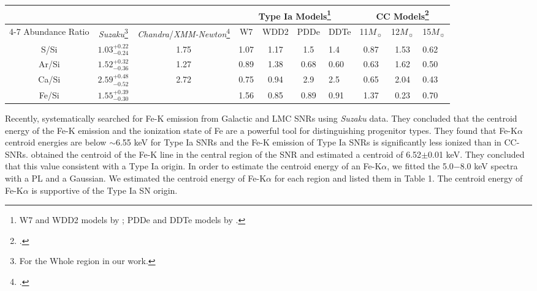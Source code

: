 \documentclass[useAMS,usenatbib]{mn2e}
\begin{document}
\begin{table*}
\caption{Comparisons of Abundance Ratios between
G306.3$-$0.9 and models.}
\begin{center}
 \begin{minipage}{140mm}
\renewcommand{\arraystretch}{1.5}
 \begin{tabular}{@{}ccccccp{1.2cm}ccp{1.2cm}@{}}
  \hline
    \hline
    &&&\multicolumn{4}{c}{Type Ia Models\footnote{W7 and WDD2 models by \citet {No97}; PDDe and DDTe models by \citet {Ba03}.}}&\multicolumn{3}{c}{CC Models\footnote{\citet {Wo95}.}}\\
    \cline{4-7}
     \cline{8-10}
      Abundance Ratio& {\it Suzaku}\footnote{For the Whole region in our work.} & {\it Chandra}/{\it XMM-Newton}\footnote{\citet {Co16}.} &W7
      & WDD2& PDDe
      & DDTe&11$M_{\sun}$&12$M_{\sun}$&15$M_{\sun}$\\
\hline
S/Si& $1.03_{-0.24}^{+0.22}$  & 1.75 &  1.07   & 1.17   & 1.5  & 1.4  & 0.87 & 1.53 & 0.62\\
Ar/Si  & $1.52_{-0.36}^{+0.32}$ & 1.27   &  0.89   & 1.38   & 0.68 & 0.60 & 0.63 & 1.62 & 0.50\\
Ca/Si  & $2.59_{-0.52}^{+0.48}$ &2.72   &  0.75   & 0.94   & 2.9  & 2.5  & 0.65 & 2.04 & 0.43\\
Fe/Si  & $1.55_{-0.30}^{+0.39}$   & &  1.56   & 0.85   & 0.89 & 0.91 & 1.37 & 0.23 & 0.70\\
  \hline
\end{tabular}
 \end{minipage}
\end{center}
\end{table*}

Recently, \citet {Ya14} systematically searched for Fe-K emission from Galactic and LMC SNRs using {\it Suzaku} data. They concluded that the centroid energy of the Fe-K emission and the ionization state of Fe are a powerful tool for distinguishing progenitor types. They found that Fe-K$\alpha$ centroid energies are below $\sim$6.55 keV for Type Ia SNRs and the Fe-K emission of Type Ia SNRs is significantly less ionized than in CC-SNRs. \citet {Co16} obtained the centroid of the Fe-K line in the central region of the SNR and estimated a centroid of 6.52$\pm$0.01 keV. They concluded that this value consistent with a Type Ia origin. In order to estimate the centroid energy of an Fe-K$\alpha$, we fitted the 5.0$-$8.0 keV spectra with a PL and a Gaussian. We estimated the centroid energy of Fe-K$\alpha$ for each region and listed them in Table 1. The centroid energy of Fe-K$\alpha$ is supportive of the Type Ia SN origin.
\end{document}
